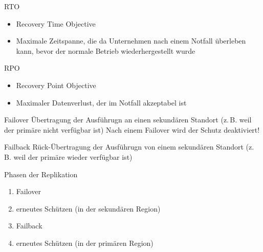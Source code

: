 \begin{flashcard}[Definition]{RTO}
    \begin{itemize}
        \item Recovery Time Objective
        \item Maximale Zeitspanne, die da Unternehmen nach einem Notfall überleben kann, bevor der normale Betrieb wiederhergestellt wurde
    \end{itemize}
\end{flashcard}

\begin{flashcard}[Definition]{RPO}
    \begin{itemize}
        \item Recovery Point Objective
        \item Maximaler Datenverlust, der im Notfall akzeptabel ist
    \end{itemize}
\end{flashcard}

\begin{flashcard}[Definition]{Failover}
    Übertragung der Ausführugn an einen sekundären Standort (z.\,B. weil der primäre nicht verfügbar ist)
    \vspace{1cm}
    Nach einem Failover wird der Schutz deaktiviert!
\end{flashcard}

\begin{flashcard}[Definition]{Failback}
    Rück-Übertragung der Ausführugn von einem sekundären Standort (z.\,B. weil der primäre wieder verfügbar ist)
\end{flashcard}

\begin{flashcard}[Definition]{Phasen der Replikation}
    \begin{enumerate}
        \item Failover
        \item erneutes Schützen (in der sekundären Region)
        \item Failback
        \item erneutes Schützen (in der primären Region)
    \end{enumerate}
\end{flashcard}

